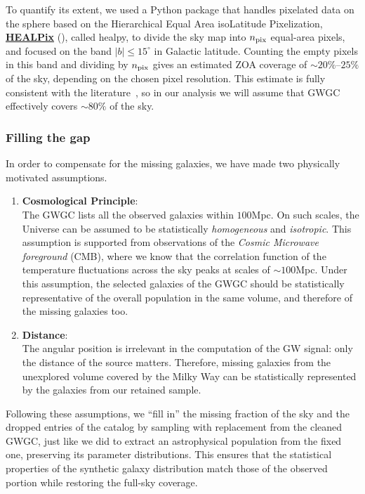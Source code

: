 To quantify its extent, we used a Python package that handles pixelated data on the sphere based on the Hierarchical Equal Area isoLatitude Pixelization, \underline{\textbf{\href{https://sourceforge.net/projects/healpix/}{HEALPix}}} {(\cite{HEALPix})}, called healpy, to divide the sky map into $n_{\rm pix}$ equal-area pixels, and focused on the band $|b| \leq 15^\circ$ in Galactic latitude.
Counting the empty pixels in this band and dividing by $n_{\rm pix}$ gives an estimated ZOA coverage of $\sim20\%$–$25\%$ of the sky, depending on the chosen pixel resolution.
This estimate is fully consistent with the literature~\cite{Kraan-Korteweg}, so in our analysis we will assume that GWGC effectively covers $\sim80\%$ of the sky.

\subsubsection{Filling the gap}
In order to compensate for the missing galaxies, we have made two physically motivated assumptions.
\begin{enumerate}
    \item \textbf{Cosmological Principle}:\\
    The GWGC lists all the observed galaxies within $100$Mpc.
    On such scales, the Universe can be assumed to be statistically \textit{homogeneous} and \textit{isotropic}. 
    This assumption is supported from observations of the \textit{Cosmic Microwave foreground} (CMB), where we know that the correlation function of the temperature fluctuations across the sky peaks at scales of $\sim100$Mpc. 
    Under this assumption, the selected galaxies of the GWGC {should} be statistically representative of the overall population in the same volume, and therefore of the missing galaxies too.
    \item \textbf{Distance}:\\ 
    The angular position is irrelevant in the computation of the GW signal: only the distance of the source matters.
    Therefore, missing galaxies from the unexplored volume covered by the Milky Way can be statistically represented by the galaxies from our retained sample.
\end{enumerate}
Following these assumptions, we “fill in” the missing fraction of the sky and the dropped entries of the catalog by sampling with replacement from the cleaned GWGC, just like we did to extract an astrophysical population from the fixed one, preserving its parameter distributions.
This ensures that the statistical properties of the synthetic galaxy distribution match those of the observed portion while restoring the full-sky coverage. 
